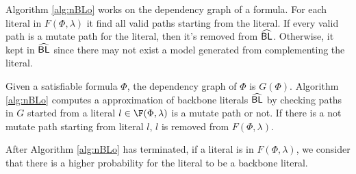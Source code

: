 Algorithm \ref{alg:nBLo} works on the dependency graph of a formula. For each literal in $F(\Phi, \lambda)$ it find all valid paths starting from the literal. If every valid path is a mutate path for the literal, then it's removed from ${\sf \widehat{BL}}$. Otherwise, it kept in ${\sf \widehat{BL}}$ since there may not exist a model generated from complementing the literal.

Given a satisfiable formula $\Phi$, the dependency graph of $\Phi$ is $G(\Phi)$. Algorithm \ref{alg:nBLo} computes a approximation of backbone literals ${\sf \widehat{BL}}$ by checking paths in $G$ started from a literal $l\in\F(\Phi, \lambda)$ is a mutate path or not. If there is a not mutate path starting from literal $l$, $l$ is removed from $F(\Phi, \lambda)$.

After Algorithm \ref{alg:nBLo} has terminated, if a literal is in $F(\Phi, \lambda)$, we consider that there is a higher probability for the literal to be a backbone literal.
